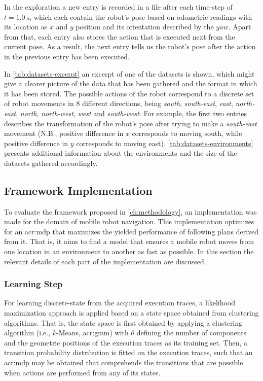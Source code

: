 In the exploration a new entry is recorded in a file after each time-step of $t = \SI{1.0}{\second}$, which each contain the robot's pose based on odometric readings with its location as $x$ and $y$ position and its orientation described by the $yaw$.
Apart from that, each entry also stores the action that is executed next from the current pose.
As a result, the next entry tells us the robot's pose after the action in the previous entry has been executed.

In \autoref{tab:datasets-excerpt} an excerpt of one of the datasets is shown, which might give a clearer picture of the data that has been gathered and the format in which it has been stored.
The possible actions of the robot correspond to a discrete set of robot movements in $8$ different directions, being \textit{south}, \textit{south-east}, \textit{east}, \textit{north-east}, \textit{north}, \textit{north-west}, \textit{west} and \textit{south-west}.
For example, the first two entries describes the transformation of the robot's pose after trying to make a \textit{south-east} movement (N.B., positive difference in $x$ corresponds to moving south, while positive difference in $y$ corresponds to moving east).
\autoref{tab:datasets-environments} presents additional information about the environments and the size of the datasets gathered accordingly.


\subsection{Framework Implementation}
\label{sec:implementation}

To evaluate the framework proposed in \autoref{ch:methodology}, an implementation was made for the domain of mobile robot navigation.
This implementation optimizes for an \acrshort{acr:mdp} that maximizes the yielded performance of following plans derived from it. That is, it aims to find a model that ensures a mobile robot moves from one location in an environment to another as fast as possible.
In this section the relevant details of each part of the implementation are discussed.

\subsubsection{Learning Step}

For learning discrete-state  from the acquired execution traces, a likelihood maximization approach is applied based on a state space obtained from clustering algorithms.
That is, the state space is first obtained by applying a clustering algorithm (i.e., $k$-Means, \acrshort{acr:gmm}) with $\theta$ defining the number of components and the geometric positions of the execution traces as its training set.
Then, a transition probability distribution is fitted on the execution traces, such that an \acrshort{acr:mdp} may be obtained that comprehends the transitions that are possible when actions are performed from any of its states.

